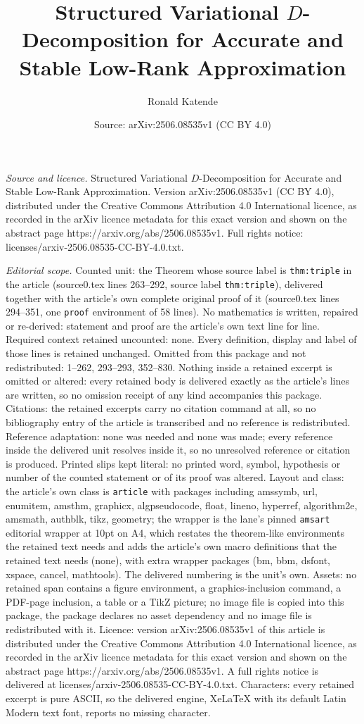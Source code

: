 \documentclass[10pt,a4paper]{amsart}
\title[Structured Variational $D$-Decomposition for Accurate and St]{Structured Variational $D$-Decomposition for Accurate and Stable Low-Rank Approximation}
\author{Ronald Katende}
\date{Source: arXiv:2506.08535v1 (CC BY 4.0)}
\begin{document}
\maketitle

\noindent\emph{Source and licence.} Structured Variational $D$-Decomposition for Accurate and Stable Low-Rank Approximation. Version arXiv:2506.08535v1 (CC BY 4.0), distributed under the Creative Commons Attribution 4.0 International licence, as recorded in the arXiv licence metadata for this exact version and shown on the abstract page https://arxiv.org/abs/2506.08535v1. Full rights notice: licenses/arxiv-2506.08535-CC-BY-4.0.txt.\par\smallskip

\noindent\textit{Editorial scope.} Counted unit: the Theorem whose source label is \texttt{thm:triple} in the article (source0.tex lines 263--292, source label \texttt{thm:triple}), delivered together with the article's own complete original proof of it (source0.tex lines 294--351, one \texttt{proof} environment of 58 lines). No mathematics is written, repaired or re-derived: statement and proof are the article's own text line for line. Required context retained uncounted: none. Every definition, display and label of those lines is retained unchanged. Omitted from this package and not redistributed: 1--262, 293--293, 352--830. Nothing inside a retained excerpt is omitted or altered: every retained body is delivered exactly as the article's lines are written, so no omission receipt of any kind accompanies this package. Citations: the retained excerpts carry no citation command at all, so no bibliography entry of the article is transcribed and no reference is redistributed. Reference adaptation: none was needed and none was made; every reference inside the delivered unit resolves inside it, so no unresolved reference or citation is produced. Printed slips kept literal: no printed word, symbol, hypothesis or number of the counted statement or of its proof was altered. Layout and class: the article's own class is \texttt{article} with packages including amssymb, url, enumitem, amsthm, graphicx, algpseudocode, float, lineno, hyperref, algorithm2e, amsmath, authblk, tikz, geometry; the wrapper is the lane's pinned \texttt{amsart} editorial wrapper at 10pt on A4, which restates the theorem-like environments the retained text needs and adds the article's own macro definitions that the retained text needs (none), with extra wrapper packages (bm, bbm, dsfont, xspace, cancel, mathtools). The delivered numbering is the unit's own. Assets: no retained span contains a figure environment, a graphics-inclusion command, a PDF-page inclusion, a table or a TikZ picture; no image file is copied into this package, the package declares no asset dependency and no image file is redistributed with it. Licence: version arXiv:2506.08535v1 of this article is distributed under the Creative Commons Attribution 4.0 International licence, as recorded in the arXiv licence metadata for this exact version and shown on the abstract page https://arxiv.org/abs/2506.08535v1. A full rights notice is delivered at licenses/arxiv-2506.08535-CC-BY-4.0.txt. Characters: every retained excerpt is pure ASCII, so the delivered engine, XeLaTeX with its default Latin Modern text font, reports no missing character.
\end{document}
